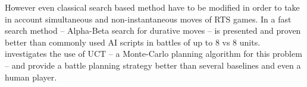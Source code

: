 
However even classical search based method have to be modified in order to take in account simultaneous and non-instantaneous moves of RTS games.
In \cite{abcd} a fast search method -- Alpha-Beta search for durative moves -- is presented and proven better than commonly used AI scripts in battles of up to 8 vs 8 units. 
\cite{wargusuct} investigates the use of UCT -- a Monte-Carlo planning algorithm for this problem -- and provide a battle planning strategy better than several baselines and even a human player.
